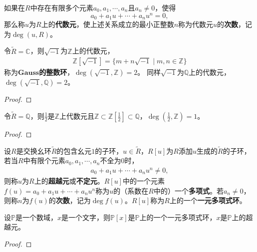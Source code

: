 \documentclass[../../main.tex]{subfiles}%
\begin{document}
\begin{definition}\label{definecolor:抽象代数--代数元的定义}
如果在\( R \)中存在有限多个元素\( a_0, a_1, \cdots, a_n \)且\( a_n \neq 0 \)，使得
\[
a_0 + a_1 u + \cdots + a_n u^n = 0,
\]
那么称\( u \)为\( R \)上的\textbf{代数元}，使上述关系成立的最小正整数\( n \)称为代数元\( u \)的\textbf{次数}，记为\( \deg(u, R) \)。
\end{definition}

\begin{example}
令$\widetilde{R}=\mathbb{C}$，则$\sqrt{-1}$为$\mathbb{Z}$上的代数元，
\begin{align*}
\mathbb{Z}[\sqrt{-1}]=\{m+n\sqrt{-1}\mid m,n\in\mathbb{Z}\}
\end{align*}
称为$\mathbf{Gauss}$\textbf{的整数环}，$\deg(\sqrt{-1},\mathbb{Z})=2$。
同样$\sqrt{-1}$为$\mathbb{Q}$上的代数元，$\deg(\sqrt{-1},\mathbb{Q})=2$。
\end{example}
\begin{proof}

\end{proof}

\begin{example}
令$\widetilde{R}=\mathbb{Q}$，则$\frac{1}{2}$是$\mathbb{Z}$上代数元且$\mathbb{Z}\subset\mathbb{Z}\left[\frac{1}{2}\right]\subset\mathbb{Q}$，$\deg\left(\frac{1}{2},\mathbb{Z}\right)=1$。
\end{example}
\begin{proof}

\end{proof}

\begin{definition}
设$R$是交换幺环$\widetilde{R}$的包含幺元$1$的子环，\( u \in \widetilde{R} \)，$R[u]$为$R$添加$u$生成的$\widetilde{R}$的子环，若当$R$中有限个元素$a_0,a_1,\cdots,a_n$不全为0时，
\begin{align*}
a_0+a_1u+\cdots+a_nu^n\neq 0,
\end{align*}
则称$u$为$R$上的\textbf{超越元}或\textbf{不定元}。$R[u]$中的一个元素$f(u)=a_0+a_1u+\cdots+a_nu^n$称为$u$的（系数在$R$中的）一个\textbf{多项式}。若$a_n\neq 0$，则称$n$为$f(u)$的\textbf{次数}，记为$\deg f(u)$。$R[u]$称为$R$上的一个\textbf{一元多项式环}。
\end{definition}

\begin{example}
设$\mathbb{P}$是一个数域，$x$是一个文字，则$\mathbb{P}[x]$是$\mathbb{P}$上的一个一元多项式环，$x$是$\mathbb{P}$上的超越元。
\end{example}
\begin{proof}

\end{proof}
\end{document}

